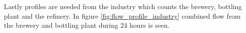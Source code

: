 



Lastly profiles are needed from the industry which counts the brewery, bottling plant and the refinery. In figure \ref{fig:flow_profile_industry} combined flow from the brewery and bottling plant during 24 hours is seen.

